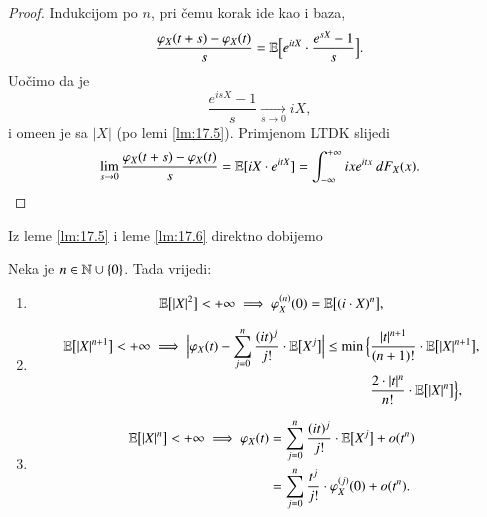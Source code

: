 \begin{proof}
    Indukcijom po $n$, pri \v cemu korak ide kao i baza,
    \begin{equation*}
        \frac{\varphi_X (t + s) - \varphi_X (t)}{s} = \mathbb{E} \Big[ e^{i t X} \cdot \frac{e^{s X} - 1}{s} \Big].
    \end{equation*}
    Uo\v cimo da je
    \begin{equation*}
        \frac{e^{i s X} - 1}{s} \xrightarrow[s \to 0]{} i X,
    \end{equation*}
    i ome\dj en je sa $|X|$ (po lemi \ref{lm:17.5}).
    Primjenom LTDK slijedi
    \begin{equation*}
        \lim\limits_{s \to 0} \frac{\varphi_X (t + s) - \varphi_X (t)}{s} = \mathbb{E} [i X \cdot e^{i t X}] = \int_{-\infty}^{+\infty} i x e^{i t x} \: d F_X (x).
    \end{equation*}
\end{proof}

Iz leme \ref{lm:17.5} i leme \ref{lm:17.6} direktno dobijemo

\begin{kor} \label{kor:17.7}
    Neka je $n \in \mathbb{N} \cup \{0\}$.
    Tada vrijedi:
    \begin{enumerate}[label=(\roman*)]
        \item \label{kor:17.7.1}
        \begin{equation*}
            \mathbb{E} \big[ |X|^2 \big] < +\infty \implies \varphi_X^{(n)}(0) = \mathbb{E} \big[ (i \cdot X)^n \big],
        \end{equation*}
        \item \label{kor:17.7.2}
        \begin{equation*}
            \begin{aligned}
                \mathbb{E} \big[|X|^{n + 1} \big] < +\infty \implies \Big| \varphi_X (t) - \sum\limits_{j = 0}^{n} \frac{(it)^j}{j !} \cdot \mathbb{E} \big[ X^j \big]  \Big| \leq
                \min \Big\{ &\frac{|t|^{n+1}}{(n + 1)!} \cdot \mathbb{E} \big[ |X|^{n + 1} \big],\\
                &\frac{2 \cdot |t|^n}{n !} \cdot \mathbb{E} \big[ |X|^n \big] \Big\},   
            \end{aligned}
        \end{equation*}
        \item \label{kor:17.7.3}
        \begin{equation*}
            \begin{aligned}
                \mathbb{E} \big[ |X|^n \big] < +\infty \implies \varphi_X (t) &= \sum\limits_{j = 0}^{n} \frac{(i t)^j}{j!} \cdot \mathbb{E} \big[ X^j \big] + o (t^n)\\
                &= \sum\limits_{j = 0}^{n} \frac{t^j}{j!} \cdot \varphi_X^{(j) } (0) + o(t^n).
            \end{aligned}
        \end{equation*}
    \end{enumerate}
\end{kor}

